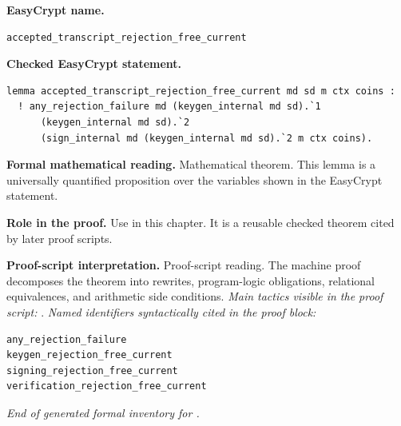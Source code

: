 \begin{formaltheorem}
\noindent\textbf{EasyCrypt name.}
\begin{lstlisting}[language=EasyCrypt,basicstyle=\ttfamily\scriptsize]
accepted_transcript_rejection_free_current
\end{lstlisting}
\noindent\textbf{Checked EasyCrypt statement.}
\begin{lstlisting}[language=EasyCrypt,basicstyle=\ttfamily\scriptsize]
lemma accepted_transcript_rejection_free_current md sd m ctx coins :
  ! any_rejection_failure md (keygen_internal md sd).`1
      (keygen_internal md sd).`2
      (sign_internal md (keygen_internal md sd).`2 m ctx coins).
\end{lstlisting}
\noindent\textbf{Formal mathematical reading.}
Mathematical theorem. This lemma is a universally quantified proposition over the variables shown in the EasyCrypt statement.

\noindent\textbf{Role in the proof.}
Use in this chapter. It is a reusable checked theorem cited by later proof scripts.

\noindent\textbf{Proof-script interpretation.}
Proof-script reading. The machine proof decomposes the theorem into rewrites, program-logic obligations, relational equivalences, and arithmetic side conditions.
\emph{Main tactics visible in the proof script:} .
\emph{Named identifiers syntactically cited in the proof block:}
\begin{lstlisting}[language=EasyCrypt,basicstyle=\ttfamily\scriptsize]
any_rejection_failure
keygen_rejection_free_current
signing_rejection_free_current
verification_rejection_free_current
\end{lstlisting}

\end{formaltheorem}

\medskip
\noindent\emph{End of generated formal inventory for .}
